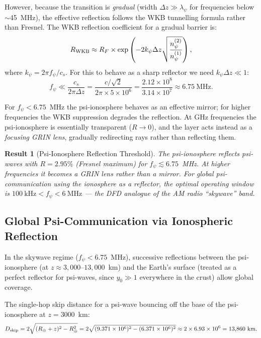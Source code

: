 \documentclass[aps,prd,twocolumn,superscriptaddress]{revtex4-2}
\newcommand{\npsi}{n_\psi}
\newtheorem{result}{Result}
\begin{document}
However, because the transition is \textit{gradual} (width
$\Delta z \gg \lambda_\psi$ for frequencies below $\sim$45~MHz),
the effective reflection follows the WKB tunnelling formula rather
than Fresnel.  The WKB reflection coefficient for a gradual barrier is:
\begin{equation}
R_{\rm WKB} \approx R_F \times \exp\left(-2k_\psi \Delta z
\sqrt{\frac{\npsi^{(2)}}{\npsi^{(1)}}}\right),
\label{eq:R-WKB}
\end{equation}
where $k_\psi = 2\pi f_\psi / c_s$.  For this to behave as a sharp
reflector we need $k_\psi \Delta z \ll 1$:
\begin{equation}
f_\psi \ll \frac{c_s}{2\pi \Delta z}
= \frac{c/\sqrt{2}}{2\pi \times 5\times10^6}
= \frac{2.12\times10^8}{3.14\times10^7}
\approx 6.75~\text{MHz}.
\label{eq:f-crit}
\end{equation}

For $f_\psi < 6.75$~MHz the psi-ionosphere behaves as an effective
mirror; for higher frequencies the WKB suppression degrades the
reflection.  At GHz frequencies the psi-ionosphere is essentially
transparent ($R \to 0$), and the layer acts instead as a \emph{focusing
GRIN lens}, gradually redirecting rays rather than reflecting them.

\begin{result}[Psi-Ionosphere Reflection Threshold]
The psi-ionosphere reflects psi-waves with $R = 2.95\%$ (Fresnel maximum)
for $f_\psi \lesssim 6.75$~MHz.  At higher frequencies it becomes
a GRIN lens rather than a mirror.  For global psi-communication using
the ionosphere as a reflector, the optimal operating window is
$100~\text{kHz} < f_\psi < 6~\text{MHz}$ --- the DFD analogue of
the AM radio ``skywave'' band.
\end{result}

\subsection{Global Psi-Communication via Ionospheric Reflection}

In the skywave regime ($f_\psi < 6.75$~MHz), successive reflections
between the psi-ionosphere (at $z \approx 3{,}000$--$13{,}000$~km) and
the Earth's surface (treated as a perfect reflector for psi-waves, since
$y_0 \gg 1$ everywhere in the crust) allow global coverage.

The single-hop skip distance for a psi-wave bouncing off the base of
the psi-ionosphere at $z = 3000$~km:
\begin{equation}
D_{\rm skip} = 2\sqrt{(R_\oplus + z)^2 - R_\oplus^2}
= 2\sqrt{(9.371\times10^6)^2 - (6.371\times10^6)^2}
\approx 2\times 6.93\times10^6 = 13{,}860~\text{km}.
\label{eq:skip}
\end{equation}
\end{document}
